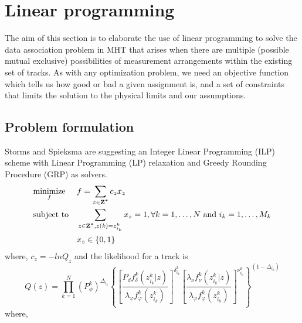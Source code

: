 \section{Linear programming}
\label{sec:ilp}
The aim of this section is to elaborate the use of linear programming to solve the data association problem in MHT that arises when there are multiple (possible mutual exclusive) possibilities of measurement arrangements within the existing set of tracks. As with any optimization problem, we need an objective function which tells us how good or bad a given assignment is, and a set of constraints that limits the solution to the physical limits and our assumptions.

\subsection{Problem formulation}
Storms and Spieksma \cite{Storms2003} are suggesting an Integer Linear Programming (ILP) scheme with Linear Programming (LP) relaxation and Greedy Rounding Procedure (GRP) as solvers. 
\begin{equation}
\begin{aligned}
& \underset{f}{\text{minimize}}
& & f=\sum_{z \in \boldsymbol{\mathbf{Z^*}}} c_z x_z \\
& \text{subject to}
& & \sum_{z \in \boldsymbol{\mathbf{Z^*}} , z(k)=z_{i_k}^k} x_z=1 , \forall k = 1, \ldots, N   \text{ and } i_k = 1, \ldots, M_k  \\
&&& x_z \in \{0,1\}
\end{aligned}
\end{equation}
where, $c_z = -lnQ_z$ and the likelihood for a track is
\begin{equation}
Q(z) = \prod_{k=1}^N (P_\phi^k)^{\Delta_{i_k}} \left \{ 
	\left[ \frac{P_d f_\delta^k (z_{i_k}^k | z)}{\lambda_\varphi f_\varphi^k(z_{i_k}^k)} \right]^{\delta_{i_k}^k} 	
	\left[ \frac{\lambda_\nu f_\nu^k(z_{i_k}^k|z)}{\lambda_\varphi f_\varphi^k(z_{i_k}^k)} \right]^{\nu_{i_k}^k}
	\right \}^{(1-\Delta_{i_k})}
\end{equation}
where,
